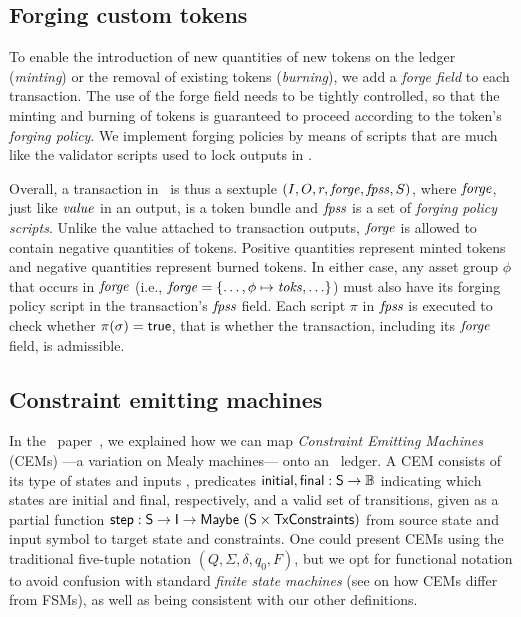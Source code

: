 \subsection{Forging custom tokens}

To enable the introduction of new quantities of new tokens on the ledger (\emph{minting}) or the removal of existing tokens (\emph{burning}), we add a \emph{forge field} to each transaction.
The use of the forge field needs to be tightly controlled, so that the minting and burning of tokens is guaranteed to proceed according to the token's \emph{forging policy}.
We implement forging policies by means of scripts that are much like the validator scripts used to lock outputs in \EUTXO.

Overall, a transaction in \EUTXOma\ is thus a sextuple \((I, O, r, \mathit{forge}, \mathit{fpss}, S)\), where $\mathit{forge}$, just like $\mathit{value}$ in an output, is a token bundle and $\mathit{fpss}$ is a set of \emph{forging policy scripts}.
Unlike the value attached to transaction outputs, $\mathit{forge}$ is allowed to contain negative quantities of tokens. Positive quantities represent minted tokens and negative quantities represent burned tokens.
In either case, any asset group $\phi$ that occurs in $\mathit{forge}$ (i.e., \(\mathit{forge} = \{\ldots, \phi \mapsto \mathit{toks}, \ldots\}\)) must also have its forging policy script in the transaction's $\mathit{fpss}$ field.
Each script $\pi$ in $\mathit{fpss}$ is executed to check whether $\pi(\sigma) = \mathsf{true}$, that is whether the transaction, including its $\mathit{forge}$ field, is admissible.

\subsection{Constraint emitting machines}
\label{sec:cem-example}
In the \EUTXO\ paper~\cite{eutxo-1-paper}, we explained how we can map \emph{Constraint Emitting Machines} (CEMs) ---a variation on Mealy machines--- onto an \EUTXO\ ledger. A CEM consists of its type of states  and inputs
, predicates $\textsf{initial}, \textsf{final} : \textsf{S} \rightarrow \mathbb{B}$
indicating which states are initial and final, respectively, and a valid set of transitions,
given as a partial function $\textsf{step} : \textsf{S} \rightarrow \textsf{I} \rightarrow
\textsf{Maybe}\ (\textsf{S} \times \textsf{TxConstraints})$ from source state and input symbol to
target state and constraints.
%
One could present CEMs using the traditional five-tuple notation $(Q, \Sigma, \delta, q_0, F)$,
but we opt for functional notation to avoid confusion with standard \textit{finite state machines}
(see \cite{eutxo-1-paper} on how CEMs differ from FSMs),
as well as being consistent with our other definitions.


